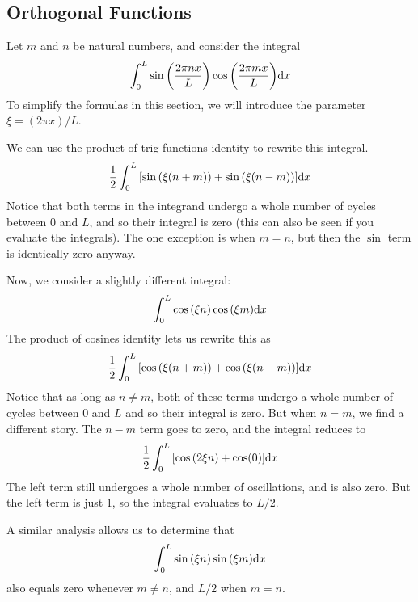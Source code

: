 \subsection*{Orthogonal Functions}
Let $m$ and $n$ be natural numbers, and consider the integral
\[ \int_0^L \sin\pqty{\frac{2\pi nx}{L}}\cos\pqty{\frac{2\pi mx}{L}}\dd x\]
To simplify the formulas in this section, we will introduce the parameter $\xi = (2\pi x)/L$.

We can use the product of trig functions identity to rewrite this integral.
\begin{align*}
   \frac{1}{2}\int_0^L \bqty{\sin\pqty{\xi (n+m)}+\sin\pqty{\xi (n-m)}}\dd x 
\end{align*}
Notice that both terms in the integrand undergo a whole number of cycles between $0$ and $L$, and so their integral is zero (this can also be seen if you evaluate the integrals). The one exception is when $m=n$, but then the $\sin$ term is identically zero anyway.

Now, we consider a slightly different integral:
\[ \int_0^L \cos\pqty{\xi n}\cos\pqty{\xi m}\dd x\]
The product of cosines identity lets us rewrite this as
\[ \frac{1}{2}\int_0^L \bqty{\cos\pqty{\xi (n+m)} + \cos\pqty{\xi (n-m)}}\dd x\]
Notice that as long as $n\ne m$, both of these terms undergo a whole number of cycles between $0$ and $L$ and so their integral is zero. But when $n=m$, we find a different story. The $n-m$ term goes to zero, and the integral reduces to
\[ \frac{1}{2}\int_0^L \bqty{\cos\pqty{2\xi n} + \cos(0)}\dd x\]
The left term still undergoes a whole number of oscillations, and is also zero. But the left term is just $1$, so the integral evaluates to $L/2$. 

A similar analysis allows us to determine that 
\[ \int_0^L \sin\pqty{\xi n}\sin\pqty{\xi m}\dd x\]
also equals zero whenever $m\ne n$, and $L/2$ when $m=n$.


